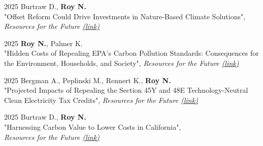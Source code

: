 \documentclass[margin]{res}
\begin{document}
\begin{resume}
2025 \hspace{4mm}%
Burtraw D., \textbf{Roy N.} \\
    \hspace*{16mm} "Offset Reform Could Drive Investments in Nature-Based Climate Solutions",  \\
    \hspace*{16mm} \textit{Resources for the Future \href{https://www.rff.org/publications/issue-briefs/offset-reform-could-drive-investments-in-nature-based-climate-solutions/}{(link)}}


2025 \hspace{4mm}%
\textbf{Roy N.}, Palmer K. \\
\hspace*{16mm} "Hidden Costs of Repealing EPA’s Carbon Pollution Standards: Consequences for \\
\hspace*{16mm} the Environment, Households, and Society",  \textit{Resources for the Future \href{
https://www.rff.org/publications/issue-briefs/hidden-costs-of-repealing-epas-carbon-pollution-standards-consequences-for-the-environment-households-and-society/}{(link)}}


2025 \hspace{4mm}%
Bergman A., Peplinski M., Rennert K., \textbf{Roy N.} \\
\hspace*{16mm} "Projected Impacts of Repealing the Section 45Y and 48E Technology-Neutral \\
    \hspace*{16mm} Clean Electricity Tax Credits",  \textit{Resources for the Future \href{https://www.rff.org/publications/issue-briefs/projected-impacts-of-repealing-the-section-45y-and-48e-technology-neutral-clean-electricity-tax-credits/}{(link)}}

2025 \hspace{4mm}%
Burtraw D., \textbf{Roy N.} \\
    \hspace*{16mm} "Harnessing Carbon Value to Lower Costs in California",  \\
    \hspace*{16mm} \textit{Resources for the Future \href{https://www.rff.org/publications/issue-briefs/harnessing-carbon-value-to-lower-costs-in-california/}{(link)}}



\end{resume}
\end{document}
